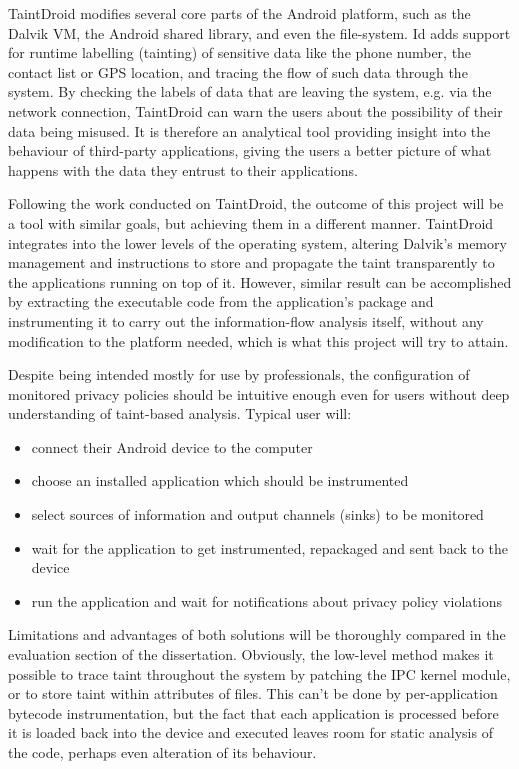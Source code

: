 \documentclass[12pt]{article}
\begin{document}
TaintDroid modifies several core parts of the Android platform, such as 
the Dalvik VM, the Android shared library, and even the file-system. 
Id adds support for runtime labelling (tainting) of sensitive data like 
the phone number, the contact list or GPS location, and tracing the flow 
of such data through the system. By checking the labels of data that are
leaving the system, e.g. via the network connection, TaintDroid can warn 
the users about the possibility of their data being misused. It is 
therefore an analytical tool providing insight into the behaviour of 
third-party applications, giving the users a better picture of what 
happens with the data they entrust to their applications.

Following the work conducted on TaintDroid, the outcome of this project 
will be a tool with similar goals, but achieving them in a different 
manner. TaintDroid integrates into the lower levels of the operating 
system, altering Dalvik's memory management and instructions to store and
propagate the taint transparently to the applications running on top of 
it. However, similar result can be accomplished by extracting the 
executable code from the application's package and instrumenting it to 
carry out the information-flow analysis itself, without any modification 
to the platform needed, which is what this project will try to attain.

Despite being intended mostly for use by professionals, the configuration 
of monitored privacy policies should be intuitive enough even for users 
without deep understanding of taint-based analysis. Typical user will:
\begin{itemize}
\item{connect their Android device to the computer}
\item{choose an installed application which should be instrumented}
\item{select sources of information and output channels (sinks) to be
      monitored}
\item{wait for the application to get instrumented, repackaged and sent
      back to the device}
\item{run the application and wait for notifications about privacy policy
      violations}
\end{itemize}

Limitations and advantages of both solutions will be thoroughly 
compared in the evaluation section of the dissertation. Obviously, 
the low-level method makes it possible to trace taint throughout 
the system by patching the IPC kernel module, or to store taint within 
attributes of files. This can't be done by per-application bytecode 
instrumentation, but the fact that each application is processed before 
it is loaded back into the device and executed leaves room for static 
analysis of the code, perhaps even alteration of its behaviour. 
\end{document}

